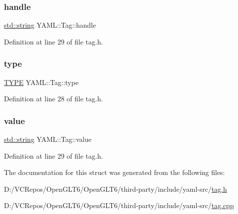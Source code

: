 \subsubsection{\texorpdfstring{handle}{handle}}
{\footnotesize\ttfamily \mbox{\hyperlink{glad_8h_ac83513893df92266f79a515488701770}{std\+::string}} Y\+A\+M\+L\+::\+Tag\+::handle}



Definition at line 29 of file tag.\+h.

\mbox{\label{struct_y_a_m_l_1_1_tag_a054044b707b23a33c847a5a346c16209}} 
\subsubsection{\texorpdfstring{type}{type}}
{\footnotesize\ttfamily \mbox{\hyperlink{struct_y_a_m_l_1_1_tag_a907531a31b340a01caa4b445ef988918}{T\+Y\+PE}} Y\+A\+M\+L\+::\+Tag\+::type}



Definition at line 28 of file tag.\+h.

\mbox{\label{struct_y_a_m_l_1_1_tag_a628cc6d02e69a7cd6b48e8ae17960385}} 
\subsubsection{\texorpdfstring{value}{value}}
{\footnotesize\ttfamily \mbox{\hyperlink{glad_8h_ac83513893df92266f79a515488701770}{std\+::string}} Y\+A\+M\+L\+::\+Tag\+::value}



Definition at line 29 of file tag.\+h.



The documentation for this struct was generated from the following files\+:\begin{DoxyCompactItemize}
\item 
D\+:/\+V\+C\+Repos/\+Open\+G\+L\+T6/\+Open\+G\+L\+T6/third-\/party/include/yaml-\/src/\mbox{\hyperlink{tag_8h}{tag.\+h}}\item 
D\+:/\+V\+C\+Repos/\+Open\+G\+L\+T6/\+Open\+G\+L\+T6/third-\/party/include/yaml-\/src/\mbox{\hyperlink{tag_8cpp}{tag.\+cpp}}\end{DoxyCompactItemize}
